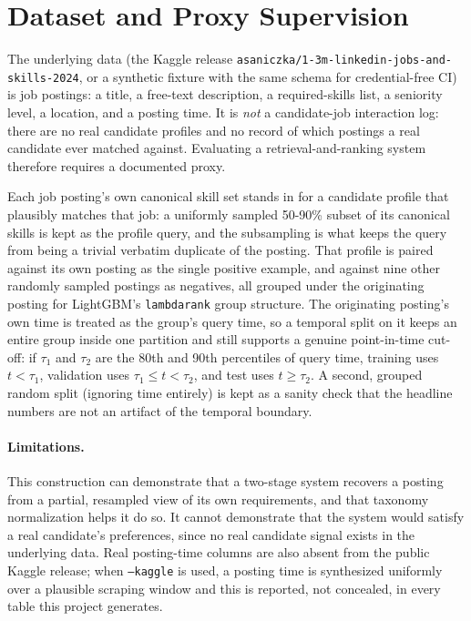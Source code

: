 \section{Dataset and Proxy Supervision}
The underlying data (the Kaggle release
\texttt{asaniczka/1-3m-linkedin-jobs-and-skills-2024}, or a synthetic
fixture with the same schema for credential-free CI) is job postings: a
title, a free-text description, a required-skills list, a seniority level,
a location, and a posting time. It is \emph{not} a candidate-job
interaction log: there are no real candidate profiles and no record of
which postings a real candidate ever matched against. Evaluating a
retrieval-and-ranking system therefore requires a documented proxy.

Each job posting's own canonical skill set stands in for a candidate
profile that plausibly matches that job: a uniformly sampled 50-90\% subset
of its canonical skills is kept as the profile query, and the subsampling
is what keeps the query from being a trivial verbatim duplicate of the
posting. That profile is paired against its own posting as the single
positive example, and against nine other randomly sampled postings as
negatives, all grouped under the originating posting for LightGBM's
\texttt{lambdarank} group structure. The originating posting's own time
is treated as the group's query time, so a temporal split on it keeps an
entire group inside one partition and still supports a genuine
point-in-time cut-off: if $\tau_1$ and $\tau_2$ are the 80th and 90th
percentiles of query time, training uses $t<\tau_1$, validation uses
$\tau_1\le t<\tau_2$, and test uses $t\ge\tau_2$. A second, grouped random
split (ignoring time entirely) is kept as a sanity check that the headline
numbers are not an artifact of the temporal boundary.

\paragraph{Limitations.} This construction can demonstrate that a two-stage
system recovers a posting from a partial, resampled view of its own
requirements, and that taxonomy normalization helps it do so. It cannot
demonstrate that the system would satisfy a real candidate's preferences,
since no real candidate signal exists in the underlying data. Real
posting-time columns are also absent from the public Kaggle release; when
\texttt{--kaggle} is used, a posting time is synthesized uniformly over a
plausible scraping window and this is reported, not concealed, in every
table this project generates.
